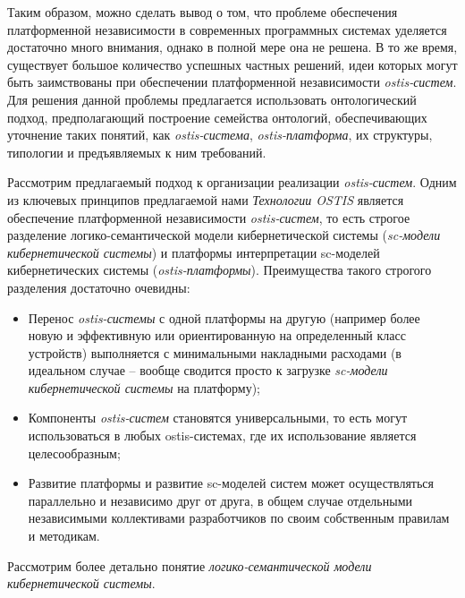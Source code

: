 Таким образом, можно сделать вывод о том, что проблеме обеспечения платформенной независимости в современных программных системах уделяется достаточно много внимания, однако в полной мере она не решена. В то же время, существует большое количество успешных частных решений, идеи которых могут быть заимствованы при обеспечении платформенной независимости \textit{ostis-систем}. Для решения данной проблемы предлагается использовать онтологический подход, предполагающий построение семейства онтологий, обеспечивающих уточнение таких понятий, как \textit{ostis-система}, \textit{ostis-платформа}, их структуры, типологии и предъявляемых к ним требований.

Рассмотрим предлагаемый подход к организации реализации \textit{ostis-систем}. Одним из ключевых принципов предлагаемой нами \textit{Технологии OSTIS} является обеспечение платформенной независимости \textit{ostis-систем}, то есть строгое разделение логико-семантической модели кибернетической системы (\textit{sc-модели кибернетической системы}) и платформы интерпретации sc-моделей кибернетических системы (\textit{ostis-платформы}). Преимущества такого строгого разделения достаточно очевидны:
\begin{itemize}
	\item Перенос \textit{ostis-системы} с одной платформы на другую (например более новую и эффективную или ориентированную на определенный класс устройств) выполняется с минимальными накладными расходами (в идеальном случае -- вообще сводится просто к загрузке \textit{sc-модели кибернетической системы} на платформу);
	\item Компоненты \textit{ostis-систем} становятся универсальными, то есть могут использоваться в любых ostis-системах, где их использование является целесообразным;
	\item Развитие платформы и развитие sc-моделей систем может осуществляться параллельно и независимо друг от друга, в общем случае отдельными независимыми коллективами разработчиков по своим собственным правилам и методикам.
\end{itemize}

Рассмотрим более детально понятие \textit{логико-семантической модели кибернетической системы}.

